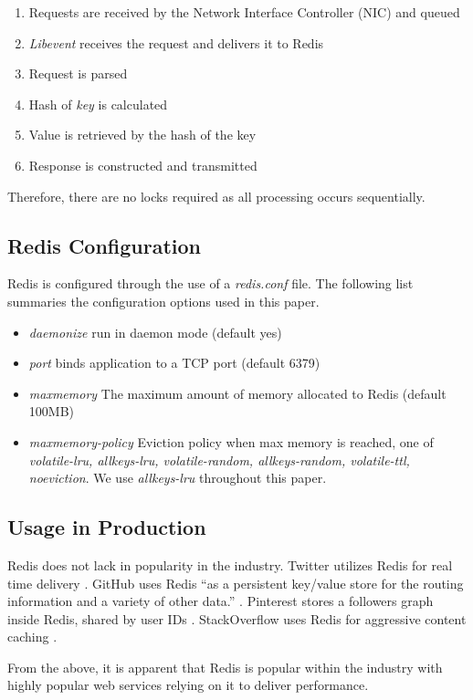 \begin{enumerate}
    \item Requests are received by the Network Interface Controller (NIC) and queued
    \item \emph{Libevent} receives the request and delivers it to Redis
    \item Request is parsed
    \item Hash of \emph{key} is calculated
    \item Value is retrieved by the hash of the key
    \item Response is constructed and transmitted
\end{enumerate}

Therefore, there are no locks required as all processing occurs sequentially.

\subsection{Redis Configuration}
Redis is configured through the use of a \textit{redis.conf} \cite{RedisConfiguration} file. The following list summaries the configuration options used in this paper.

\begin{itemize}
    \item \emph{daemonize} run in daemon mode (default yes)
    \item \emph{port} binds application to a TCP port (default 6379)
    \item \emph{maxmemory} The maximum amount of memory allocated to Redis (default 100MB)
    \item \emph{maxmemory-policy} Eviction policy when max memory is reached, one of \textit{volatile-lru, allkeys-lru, volatile-random, allkeys-random, volatile-ttl, noeviction}. We use \textit{allkeys-lru} throughout this paper.
\end{itemize}

\subsection{Usage in Production}
Redis does not lack in popularity in the industry. Twitter utilizes Redis for real time delivery \cite{redisTwitterRealTime}. GitHub uses Redis ``as a persistent key/value store for the routing information and a variety of other data.'' \cite{redisGithub}. Pinterest stores a followers graph inside Redis, shared by user IDs \cite{redisPinterest}. StackOverflow uses Redis for aggressive content caching \cite{redisStackOverflow}.

From the above, it is apparent that Redis is popular within the industry with highly popular web services relying on it to deliver performance.